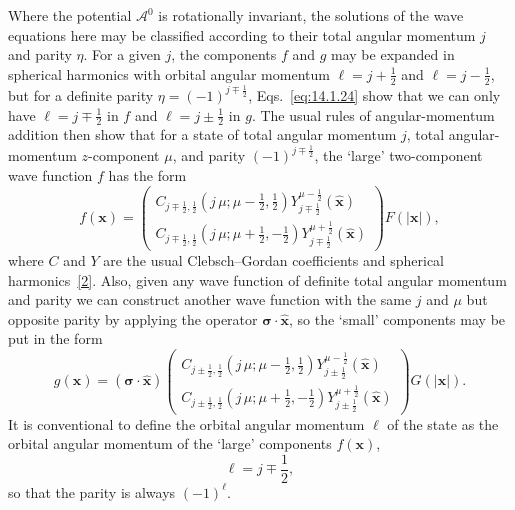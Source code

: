 Where the potential $\mathcal A^0$ is rotationally invariant, the solutions of
the wave equations here may be classified according to their total angular
momentum $j$ and parity $\eta$. For a given $j$, the components $f$ and $g$ may
be expanded in spherical harmonics with orbital angular momentum
$\ell=j+\frac12$ and $\ell=j-\frac12$, but for a definite parity
$\eta=(-1)^{j\mp\frac12}$, Eqs.~\eqref{eq:14.1.24} show that we can only have
$\ell=j\mp\frac12$ in $f$ and $\ell=j\pm\frac12$ in $g$. The usual rules of
angular-momentum addition then show that for a state of total angular momentum
$j$, total angular-momentum $z$-component $\mu$, and parity
$(-1)^{j\mp\frac12}$, the `large' two-component wave function $f$ has the form
\begin{equation}
 f(\mathbf x)=
 \begin{pmatrix}
 C_{j\mp\frac12,\frac12}(j\,\mu;\mu-\frac12,\frac12)
 Y_{j\mp\frac12}^{\mu-\frac12}(\hat{\mathbf x})\\
 C_{j\mp\frac12,\frac12}(j\,\mu;\mu+\frac12,-\frac12)
 Y_{j\mp\frac12}^{\mu+\frac12}(\hat{\mathbf x})
 \end{pmatrix}F(|\mathbf x|),
 \tag{14.1.25}\label{eq:14.1.25}
\end{equation}
where $C$ and $Y$ are the usual Clebsch--Gordan coefficients and spherical
harmonics~\hyperlink{ref:14.2}{[2]}. Also, given any wave function of definite
total angular momentum and parity we can construct another wave function with
the same $j$ and $\mu$ but opposite parity by applying the operator
$\boldsymbol\sigma\cdot\hat{\mathbf x}$, so the `small' components may be put
in the form
\begin{equation}
 g(\mathbf x)=(\boldsymbol\sigma\cdot\hat{\mathbf x})
 \begin{pmatrix}
 C_{j\pm\frac12,\frac12}(j\,\mu;\mu-\frac12,\frac12)
 Y_{j\pm\frac12}^{\mu-\frac12}(\hat{\mathbf x})\\
 C_{j\pm\frac12,\frac12}(j\,\mu;\mu+\frac12,-\frac12)
 Y_{j\pm\frac12}^{\mu+\frac12}(\hat{\mathbf x})
 \end{pmatrix}G(|\mathbf x|).
 \tag{14.1.26}\label{eq:14.1.26}
\end{equation}
It is conventional to define the orbital angular momentum $\ell$ of the state
as the orbital angular momentum of the `large' components $f(\mathbf x)$,
\begin{equation}
  \ell=j\mp\frac12,
  \tag{14.1.27}\label{eq:14.1.27}
\end{equation}
so that the parity is always $(-1)^\ell$.

